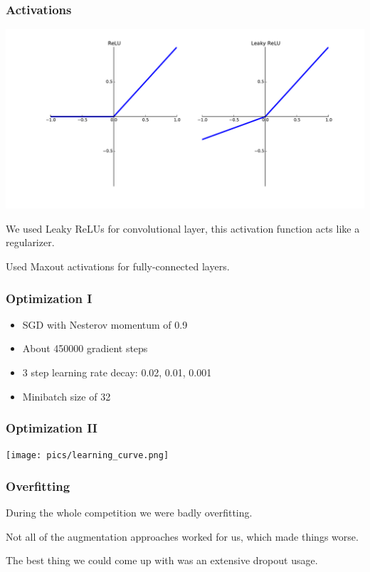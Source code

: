 \begin{frame}\frametitle{Activations}
\begin{center}
\includegraphics[valign=t,scale=0.2]{pics/relus.pdf}
\end{center}
\par We used Leaky ReLUs for convolutional layer, this activation function acts like a regularizer.
\par Used Maxout activations for fully-connected layers.
\end{frame}



\begin{frame}\frametitle{Optimization I}
\begin{itemize}
\item SGD with Nesterov  momentum of 0.9
\item About 450000 gradient steps
\item 3 step learning rate decay: 0.02, 0.01, 0.001
\item Minibatch size of 32
\end{itemize}
\end{frame}

\begin{frame}\frametitle{Optimization II}
\begin{center}
\texttt{[image: pics/learning\_curve.png]}
\end{center}
\end{frame}



\begin{frame}\frametitle{Overfitting}
\par During the whole competition we were badly overfitting.
\par Not all of the augmentation approaches worked for us, which made things worse.
\par The best thing we could come up with was an extensive dropout usage.
\end{frame}

